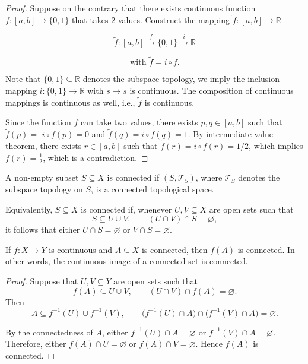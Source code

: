 \begin{proof}
    Suppose on the contrary that there exists continuous function \(f : \left\lbrack  {a,b}\right\rbrack   \rightarrow  \{ 0,1\}\) that takes 2 values. Construct the mapping \(\widetilde{f} : \left\lbrack  {a,b}\right\rbrack   \rightarrow  \mathbb{R}\)

\[
\widetilde{f} : \left\lbrack  {a,b}\right\rbrack  \overset{f}{ \rightarrow  }\{ 0,1\} \overset{i}{ \rightarrow  }\mathbb{R}
\]

\[
\text{ with }\widetilde{f} = i \circ  f\text{. }
\]

Note that \(\{ 0,1\}  \subseteq  \mathbb{R}\) denotes the subspace topology, we imply the inclusion mapping \(i : \{ 0,1\}  \rightarrow  \mathbb{R}\) with \(s \mapsto  s\) is continuous. The composition of continuous mappings is continuous as well, i.e., \(\widetilde{f}\) is continuous.

Since the function \(f\) can take two values, there exists \(p,q \in  \left\lbrack  {a,b}\right\rbrack\) such that \(\widetilde{f}\left( p\right)  =\)  \(i \circ  f\left( p\right)  = 0\) and \(\widetilde{f}\left( q\right)  = i \circ  f\left( q\right)  = 1\). By intermediate value theorem, there exists \(r \in  \left\lbrack  {a,b}\right\rbrack\) such that \(\widetilde{f}\left( r\right)  = i \circ  f\left( r\right)  = 1/2\), which implies \(f\left( r\right)  = \frac{1}{2}\), which is a contradiction.
\end{proof} 

\begin{definition} \label{def:connected_subset}
A non-empty subset \(S \subseteq X\) is connected if \((S, \mathcal{T}_S)\), where \(\mathcal{T}_S\) denotes the subspace topology on \(S\), is a connected topological space.

Equivalently, \(S \subseteq X\) is connected if, whenever \(U,V \subseteq X\) are open sets such that
\[
S \subseteq U \cup V, \qquad (U \cap V) \cap S = \varnothing,
\]
it follows that either \(U \cap S = \varnothing\) or \(V \cap S = \varnothing\).
\end{definition}

\begin{proposition} \label{prop:connected_image}
If \(f : X \to Y\) is continuous and \(A \subseteq X\) is connected, then \(f(A)\) is connected.  
In other words, the continuous image of a connected set is connected.
\end{proposition}

\begin{proof}
Suppose that \(U,V \subseteq Y\) are open sets such that
\[
f(A) \subseteq U \cup V, 
\qquad (U \cap V) \cap f(A) = \varnothing.
\]
Then
\[
A \subseteq f^{-1}(U) \cup f^{-1}(V), 
\qquad \bigl(f^{-1}(U) \cap A\bigr) \cap \bigl(f^{-1}(V) \cap A\bigr) = \varnothing.
\]

By the connectedness of \(A\), either \(f^{-1}(U) \cap A = \varnothing\) or \(f^{-1}(V) \cap A = \varnothing\).  
Therefore, either \(f(A) \cap U = \varnothing\) or \(f(A) \cap V = \varnothing\).  
Hence \(f(A)\) is connected.
\end{proof}

